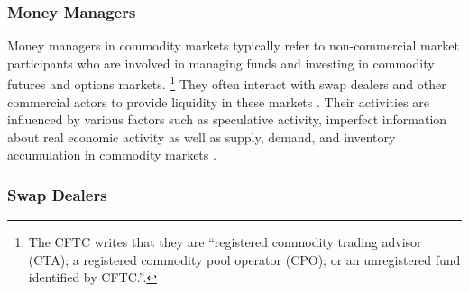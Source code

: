 \subsubsection{Money Managers}%
Money managers in commodity markets typically refer to non-commercial market participants who are involved in managing funds and investing in commodity futures and options markets. \cite{zhang2022}\footnote{The CFTC writes that they are ``registered commodity trading advisor (CTA); a registered commodity pool operator (CPO); or an unregistered fund identified by CFTC.''.} They often interact with swap dealers and other commercial actors to provide liquidity in these markets \cite{zhang2022}. Their activities are influenced by various factors such as speculative activity, imperfect information about real economic activity as well as supply, demand, and inventory accumulation in  commodity markets \citep{singleton2014}. %


\subsubsection{Swap Dealers}

